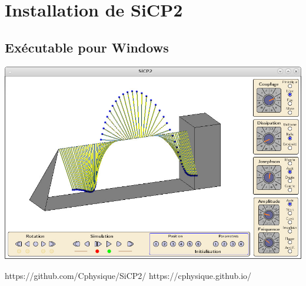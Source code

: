 \section{Installation de SiCP2}
%
\subsection{Exécutable pour Windows}
%
\begin{center}
\includegraphics[width=.9\textwidth]{./illustration/SiCP2}
\end{center}
%
https://github.com/Cphysique/SiCP2/
https://cphysique.github.io/
%
